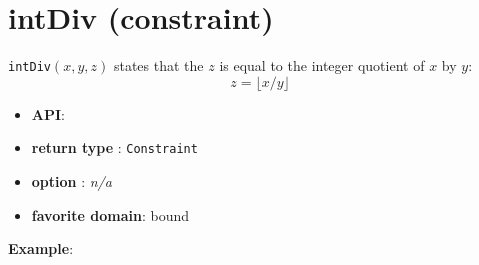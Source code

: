 \label{intdiv}
\hypertarget{intdiv}{}

\section{intDiv (constraint)}\label{intdiv:intdivconstraint}\hypertarget{intdiv:intdivconstraint}{}
\begin{notedef}
  \texttt{intDiv}$(x,y,z)$ states that the $z$ is equal to the integer quotient of $x$ by $y$:
$$z = \lfloor x / y \rfloor$$
\end{notedef}

\begin{itemize}
	\item \textbf{API}: 
	\item \textbf{return type} : \texttt{Constraint}
	\item \textbf{option} : \emph{n/a}
	\item \textbf{favorite domain}: bound
\end{itemize}

\textbf{Example}:

